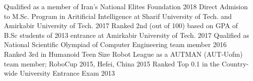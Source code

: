 

\begin{cvhonors}
\cvhonor
{Qualified} %
{as a member of Iran's National Elites Foundation} %
{} %
{2018} %
	\cvhonor
	{Direct Admision to M.Sc. Program} %
	{in Aritificial Intelligence at Sharif University of Tech. and Amirkabir University of Tech.} %
	{} %
	{2017} %
	\cvhonor
	{Ranked 2nd} %
	{(out of 100) based on GPA of B.Sc students of 2013 entrance at Amirkabir University of Tech.} %
	{} %
	{2017} %
	\cvhonor
	{Qualified} %
	{as National Scientific Olympiad  of Computer Engineering team member} %
	{} %
	{2016} %
    \cvhonor
    {Ranked 3rd} %
    {in Humanoid Teen Size Robot League as a AUTMAN (AUT-Uofm) team member; RoboCup 2015, Hefei, China} %
    {} %
    {2015} %
	\cvhonor
	{Ranked Top 0.1} %
	{in the Country-wide University Entrance Exam} %
	{} %
	{2013} %
\end{cvhonors}
